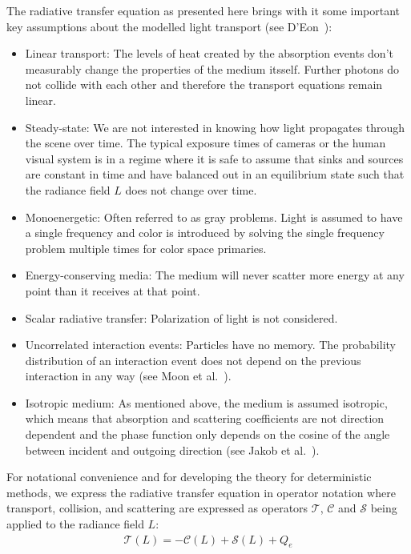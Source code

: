 The radiative transfer equation as presented here brings with it some important key assumptions about the modelled light transport (see D'Eon~\cite{DEon14}):
\begin{itemize}
\item Linear transport: The levels of heat created by the absorption events don't measurably change the properties of the medium itsself. Further photons do not collide with each other and therefore the transport equations remain linear.
\item Steady-state: We are not interested in knowing how light propagates through the scene over time. The typical exposure times of cameras or the human visual system is in a regime where it is safe to assume that sinks and sources are constant in time and have balanced out in an equilibrium state such that the radiance field $L$ does not change over time.
\item Monoenergetic: Often referred to as gray problems. Light is assumed to have a single frequency and color is introduced by solving the single frequency problem multiple times for color space primaries.
\item Energy-conserving media: The medium will never scatter more energy at any point than it receives at that point.
\item Scalar radiative transfer: Polarization of light is not considered.
\item Uncorrelated interaction events: Particles have no memory. The probability distribution of an interaction event does not depend on the previous interaction in any way (see Moon et al.~\cite{Moon07}).
\item Isotropic medium: As mentioned above, the medium is assumed isotropic, which means that absorption and scattering coefficients are not direction dependent and the phase function only depends on the cosine of the angle between incident and outgoing direction (see Jakob et al.~\cite{Jakob10}).
\end{itemize}

For notational convenience and for developing the theory for deterministic methods, we express the radiative transfer equation in operator notation where transport, collision, and scattering are expressed as operators $\mathcal{T}$, $\mathcal{C}$ and $\mathcal{S}$ being applied to the radiance field $L$:
\begin{align}
\mathcal{T}\left(L\right) = -\mathcal{C}\left(L\right) + \mathcal{S}\left(L\right) + Q_e
\label{eq:rte_operator_notation}
\end{align}


